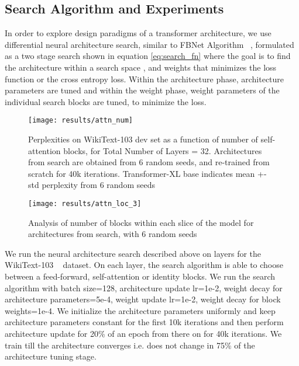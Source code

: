\documentclass[11pt]{article}
\begin{document}
\subsection{Search Algorithm and Experiments} \label{observations}

In order to explore design paradigms of a transformer architecture, we use differential neural architecture search, similar to FBNet Algorithm ~\citep{fbnet}, formulated as a two stage search shown in equation \ref{eq:search_fn} where the goal is to find the architecture  within a search space , and weights  that minimizes the loss function  or the cross entropy loss. Within the architecture phase, architecture parameters  are tuned and within the weight phase, weight parameters of the individual search blocks are tuned, to minimize the loss.







\begin{figure}
\centering
\texttt{[image: results/attn\_num]}
\caption{Perplexities on WikiText-103 dev set as a function of number of self-attention blocks, for Total Number of Layers = 32. Architectures from search are obtained from 6 random seeds, and re-trained from scratch for 40k iterations. Transformer-XL base indicates mean +- std perplexity from 6 random seeds}
\label{fig:attn_num}
\end{figure}

\begin{figure}
\centering
\texttt{[image: results/attn\_loc\_3]}
\caption{Analysis of number of blocks within each slice of the model for architectures from search, with 6 random seeds}
\label{fig:attn_loc}
\end{figure}


We run the neural architecture search described above on  layers for the WikiText-103 ~\citep{wikitext103} dataset. On each layer, the search algorithm is able to choose between a feed-forward, self-attention or identity blocks. We run the search algorithm with batch size=128, architecture update lr=1e-2, weight decay for architecture parameters=5e-4, weight update lr=1e-2, weight decay for block weights=1e-4. We initialize the architecture parameters uniformly and keep architecture parameters constant for the first 10k iterations and then perform architecture update for 20\% of an epoch from there on for 40k iterations. We train till the architecture converges i.e. does not change in 75\% of the architecture tuning stage.
\end{document}
